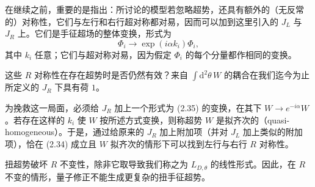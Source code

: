 在继续之前，重要的是指出：所讨论的模型若忽略超势，还具有额外的（无反常的）对称性，它们与左行和右行超对称都对易，因而可以加到这里引入的 $J_L$ 与 $J_R$ 上。它们是手征超场的整体变换，形式为
\begin{equation}\tag{2.35}
\Phi_i\to\exp(i\alpha k_i)\Phi_i,
\end{equation}
其中 $k_i$ 任意；它们与超对称对易，因为假定 $\Phi_i$ 的每个分量都作相同的变换。


这些 $R$ 对称性在存在超势时是否仍然有效？来自 $\int \mathrm{d}^{2}\theta\,W$ 的耦合在我们迄今为止所定义的 $J_R$ 下具有荷 $1$。

\label{op:16}

为挽救这一局面，必须给 $J_R$ 加上一个形式为 (2.35) 的变换，在其下 $W\to e^{-i\alpha}W$。若存在这样的 $k_i$ 使 $W$ 按所述方式变换，则称超势 $W$ 是拟齐次的（quasi-homogeneous）。于是，通过给原来的 $J_R$ 加上附加项（并对 $J_L$ 加上类似的附加项），恰在 (2.34) 成立且 $W$ 拟齐次的情形下可以找到左行与右行 $R$ 对称性。

扭超势破坏 $R$ 不变性，除非它取导致我们称之为 $L_{D,\theta}$ 的线性形式。因此，在 $R$ 不变的情形，量子修正不能生成更复杂的扭手征超势。

